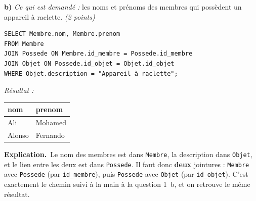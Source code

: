 \documentclass[11pt, a4paper]{exam}
\newcommand{\code}[1]{\texttt{#1}}
\newcommand{\rappel}[1]{\noindent\textit{Ce qui est demandé :} #1\par\smallskip}
\newcommand{\explication}{\noindent\textbf{Explication.}\ }
\newcommand{\resultat}[1]{\par\smallskip\noindent\textit{Résultat :}\par\nopagebreak\begin{center}\small #1\end{center}}
\begin{document}
\textbf{b)} \rappel{les noms et prénoms des membres qui possèdent un appareil à raclette. \hfill\textit{(2 points)}}
\begin{reponse}
\begin{lstlisting}
SELECT Membre.nom, Membre.prenom
FROM Membre
JOIN Possede ON Membre.id_membre = Possede.id_membre
JOIN Objet ON Possede.id_objet = Objet.id_objet
WHERE Objet.description = "Appareil à raclette";
\end{lstlisting}
\end{reponse}
\resultat{\begin{tabular}{|l|l|}\hline nom & prenom \\\hline Ali & Mohamed \\ Alonso & Fernando \\\hline\end{tabular}}
\explication Le nom des membres est dans \code{Membre}, la description dans \code{Objet}, et le lien entre les deux est dans \code{Possede}. Il faut donc \textbf{deux} jointures : \code{Membre} avec \code{Possede} (par \code{id\_membre}), puis \code{Possede} avec \code{Objet} (par \code{id\_objet}). C'est exactement le chemin suivi à la main à la question 1~b, et on retrouve le même résultat.
\end{document}
